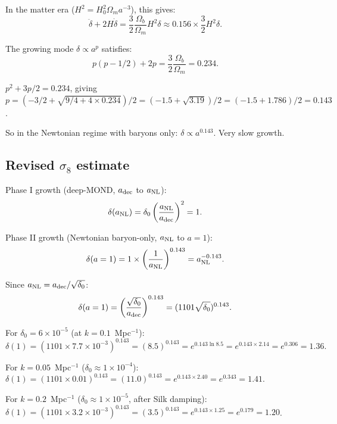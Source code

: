 \documentclass[11pt]{article}
\newcommand{\ee}[1]{\times 10^{#1}}
\newcommand{\Ob}{\Omega_b}
\newcommand{\Om}{\Omega_m}
\begin{document}
In the matter era ($H^2 = H_0^2\Om a^{-3}$), this gives:
\begin{equation}
\ddot\delta + 2H\dot\delta = \frac{3}{2}\frac{\Ob}{\Om}H^2\delta
\approx 0.156\times\frac{3}{2}H^2\delta.
\end{equation}

The growing mode $\delta \propto a^p$ satisfies:
\begin{equation}
p(p-1/2) + 2p = \frac{3}{2}\frac{\Ob}{\Om} = 0.234.
\end{equation}

$p^2 + 3p/2 = 0.234$, giving $p = (-3/2 + \sqrt{9/4 + 4\times 0.234})/2
= (-1.5 + \sqrt{3.19})/2 = (-1.5 + 1.786)/2 = 0.143$.

So in the Newtonian regime with baryons only:
$\delta \propto a^{0.143}$. Very slow growth.

\subsection{Revised $\sigma_8$ estimate}

Phase I growth (deep-MOND, $a_{\rm dec}$ to $a_{\rm NL}$):
\begin{equation}
\delta(a_{\rm NL}) = \delta_0\left(\frac{a_{\rm NL}}{a_{\rm dec}}\right)^2 = 1.
\end{equation}

Phase II growth (Newtonian baryon-only, $a_{\rm NL}$ to $a = 1$):
\begin{equation}
\delta(a = 1) = 1\times\left(\frac{1}{a_{\rm NL}}\right)^{0.143}
= a_{\rm NL}^{-0.143}.
\end{equation}

Since $a_{\rm NL} = a_{\rm dec}/\sqrt{\delta_0}$:
\begin{equation}
\delta(a = 1) = \left(\frac{\sqrt{\delta_0}}{a_{\rm dec}}\right)^{0.143}
= (1101\sqrt{\delta_0})^{0.143}.
\end{equation}

For $\delta_0 = 6\ee{-5}$ (at $k = 0.1$~Mpc$^{-1}$):
\begin{equation}
\delta(1) = (1101\times 7.7\ee{-3})^{0.143}
= (8.5)^{0.143} = e^{0.143\ln 8.5}
= e^{0.143\times 2.14} = e^{0.306} = 1.36.
\end{equation}

For $k = 0.05$~Mpc$^{-1}$ ($\delta_0 \approx 1\ee{-4}$):
$\delta(1) = (1101\times 0.01)^{0.143} = (11.0)^{0.143}
= e^{0.143\times 2.40} = e^{0.343} = 1.41$.

For $k = 0.2$~Mpc$^{-1}$ ($\delta_0 \approx 1\ee{-5}$, after Silk damping):
$\delta(1) = (1101\times 3.2\ee{-3})^{0.143} = (3.5)^{0.143}
= e^{0.143\times 1.25} = e^{0.179} = 1.20$.
\end{document}
